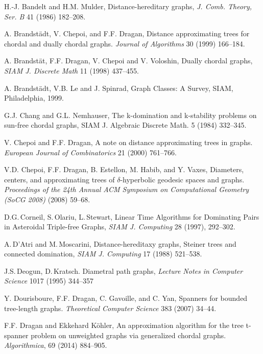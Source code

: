 \documentclass[10pt]{llncs}
\begin{document}
\begin{thebibliography}{99}

    H.-J. Bandelt and H.M. Mulder, 
    Distance-hereditary graphs, 
    \emph{J. Comb. Theory, Ser. B} 41 (1986) 182--208.

    A. Brandstädt, V. Chepoi, and F.F. Dragan,
    Distance approximating trees for chordal and dually chordal graphs.
    \emph{Journal of Algorithms} 30 (1999) 166--184.

    A. Brandstät, F.F. Dragan, V. Chepoi and V. Voloshin,
    Dually chordal graphs,
    \emph{SIAM J. Discrete Math} 11 (1998) 437--455.

    A. Brandstädt, V.B. Le and J. Spinrad,
    Graph Classes: A Survey,
    SIAM, Philadelphia, 1999.

     G.J. Chang and G.L. Nemhauser, 
     The k-domination and k-stability problems on sun-free chordal graphs, 
     SIAM J. Algebraic Discrete Math. 5 (1984) 332--345.

    V. Chepoi and F.F. Dragan,
    A note on distance approximating trees in graphs.
    \emph{European Journal of Combinatorics} 21 (2000) 761--766.

    V.D. Chepoi, F.F. Dragan, B. Estellon, M. Habib, and Y. Vaxes,
    Diameters, centers, and approximating trees of $\delta$-hyperbolic geodesic spaces and graphs.
    \emph{Proceedings of the 24th Annual ACM Symposium on Computational Geometry (SoCG 2008)} (2008) 59--68.

    D.G.\,Corneil, S.\,Olariu, L.\,Stewart,
    Linear Time Algorithms for Dominating Pairs in Asteroidal Triple-free Graphs,
    \emph{SIAM J. Computing} 28 (1997), 292--302.

    A.\,D'Atri and M.\,Moscarini,
    Distance-hereditaxy graphs, Steiner trees and connected domination, 
    \emph{SIAM J. Computing} 17 (1988) 521--538.

    J.S.\,Deogun, D.\,Kratsch. 
    Diametral path graphs,
    \emph{Lecture Notes in Computer Science} 1017 (1995) 344--357 

    Y. Dourisboure, F.F. Dragan, C. Gavoille, and C. Yan,
    Spanners for bounded tree-length graphs.
    \emph{Theoretical Computer Science} 383 (2007) 34--44.

    F.F. Dragan and Ekkehard Köhler,
    An approximation algorithm for the tree t-spanner problem on unweighted graphs via generalized chordal graphs.
    \emph{Algorithmica}, 69 (2014) 884--905.


\end{thebibliography}
\end{document}
